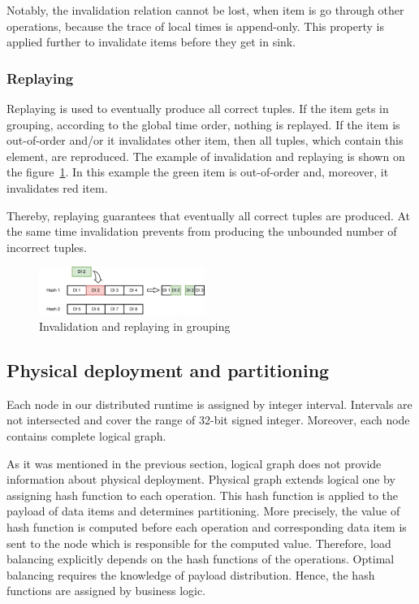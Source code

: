 Notably, the invalidation relation cannot be lost, when item is go through other operations, because the trace of local times is append-only. This property is applied further to invalidate items before they get in sink.

\subsubsection{Replaying}

Replaying is used to eventually produce all correct tuples. If the item gets in grouping, according to the global time order, nothing is replayed. If the item is out-of-order and/or it invalidates other item, then all tuples, which contain this element, are reproduced. The example of invalidation and replaying is shown on the figure~\ref{grouping-invalidation-figure}. In this example the green item is out-of-order and, moreover, it invalidates red item.

Thereby, replaying guarantees that eventually all correct tuples are produced. At the same time invalidation prevents from producing the unbounded number of incorrect tuples. 

\begin{figure}[htbp]
  \centering
  \includegraphics[width=0.48\textwidth]{pics/grouping-invalidation}
  \caption{Invalidation and replaying in grouping}
  \label {grouping-invalidation-figure}
\end{figure}

\subsection{Physical deployment and partitioning}

Each node in our distributed runtime is assigned by integer interval. Intervals are not intersected and cover the range of 32-bit signed integer. Moreover, each node contains complete logical graph.

As it was mentioned in the previous section, logical graph does not provide information about physical deployment. Physical graph extends logical one by assigning hash function to each operation. This hash function is applied to the payload of data items and determines partitioning. More precisely, the value of hash function is computed before each operation and corresponding data item is sent to the node which is responsible for the computed value. Therefore, load balancing explicitly depends on the hash functions of the operations. Optimal balancing requires the knowledge of payload distribution. Hence, the hash functions are assigned by business logic.

